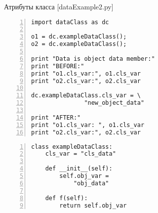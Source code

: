 \documentclass[hyperref={pdftex,unicode}]{beamer}
\begin{document}
\begin{frame}[fragile]{Атрибуты класса [dataExample2.py]}
\begin{minipage}{0.6\linewidth}
    \begin{lstlisting}[numbers=left,basicstyle=\scriptsize\ttfamily]
import dataClass as dc                                                                          
                                                                                                
o1 = dc.exampleDataClass();                                                                     
o2 = dc.exampleDataClass();                                                                     
                                                                                                
print "Data is object data member:"                                                             
print "BEFORE:"                                                                                 
print "o1.cls_var:", o1.cls_var                                                                 
print "o2.cls_var:", o2.cls_var                                                                 
                                                                                                
dc.exampleDataClass.cls_var = \
               "new_object_data"                                                 
                                                                                                
print "AFTER:"                                                                                  
print "o1.cls_var: ", o1.cls_var                                                                
print "o2.cls_var:", o2.cls_var 
    \end{lstlisting}
\end{minipage}
\hfill
\begin{minipage}{0.35\linewidth}
    \begin{lstlisting}[numbers=left,basicstyle=\tiny\ttfamily,numbers=none]
class exampleDataClass:                                                                                                      
    cls_var = "cls_data"                                                                        

    def __init__(self):                                                                         
        self.obj_var =
            "obj_data"   
                                                            
    def f(self):                                                                                
        return self.obj_var
    \end{lstlisting}
\end{minipage}
\end{frame}
\end{document}

